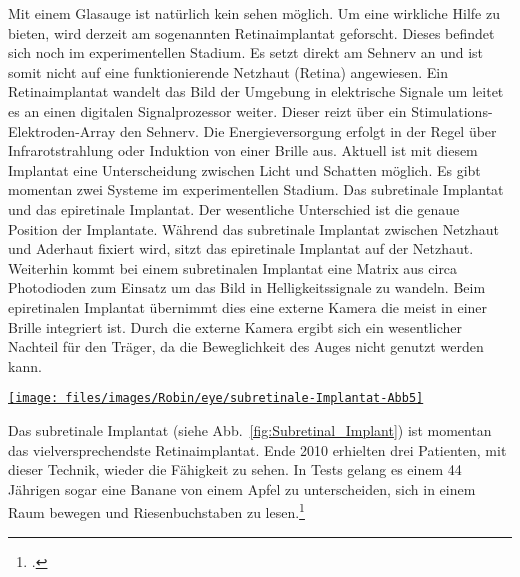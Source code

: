 Mit einem Glasauge ist natürlich kein sehen möglich. Um eine wirkliche Hilfe zu bieten, wird derzeit
am sogenannten Retinaimplantat geforscht. Dieses befindet sich noch im experimentellen Stadium.
Es setzt direkt am
Sehnerv an und ist somit nicht auf eine funktionierende Netzhaut (Retina) angewiesen. Ein
Retinaimplantat wandelt das Bild der Umgebung in elektrische Signale um leitet es an einen digitalen
Signalprozessor weiter. Dieser reizt über ein Stimulations-Elektroden-Array den Sehnerv. Die
Energieversorgung erfolgt in der Regel über Infrarotstrahlung oder Induktion von einer Brille aus.
Aktuell ist mit diesem Implantat eine Unterscheidung zwischen Licht und Schatten möglich. Es gibt
momentan zwei Systeme im experimentellen Stadium. Das subretinale Implantat und das epiretinale
Implantat. Der wesentliche Unterschied ist die genaue Position der Implantate. Während das
subretinale Implantat zwischen Netzhaut und Aderhaut fixiert wird, sitzt das epiretinale Implantat
auf der Netzhaut. Weiterhin kommt bei einem subretinalen Implantat eine Matrix aus circa
 Photodioden zum Einsatz um das Bild in Helligkeitssignale zu wandeln. Beim
epiretinalen
Implantat übernimmt dies eine externe Kamera die meist in einer Brille integriert ist. Durch die
externe Kamera ergibt sich ein wesentlicher Nachteil für den Träger, da die Beweglichkeit des Auges
nicht genutzt werden kann.

\begin{figurewrapper}
	\href{http://www.oe.uni-duisburg-essen.de/latestnews/augenblicke/Abb5.jpg}{%
		\texttt{[image: files/images/Robin/eye/subretinale-Implantat-Abb5]}%
	}
	\label{fig:Subretinal_Implant}
\end{figurewrapper}

Das subretinale Implantat (siehe Abb.~\vref{fig:Subretinal_Implant}) ist momentan das
vielversprechendste Retinaimplantat. Ende 2010 erhielten
drei Patienten, mit dieser Technik, wieder die Fähigkeit zu sehen. In Tests gelang es einem 44
Jährigen sogar eine Banane von einem Apfel zu unterscheiden, sich in einem Raum bewegen und
Riesenbuchstaben zu lesen.\footcite{Independent:retina_chip}
